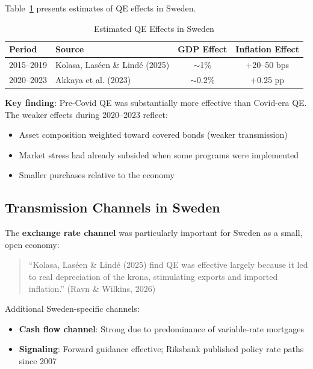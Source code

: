 \documentclass[11pt,a4paper]{article}
\begin{document}
Table~\ref{tab:sweden_effects} presents estimates of QE effects in Sweden.

\begin{table}[H]
\centering
\caption{Estimated QE Effects in Sweden}
\label{tab:sweden_effects}
\begin{tabular}{llcc}
\toprule
\textbf{Period} & \textbf{Source} & \textbf{GDP Effect} & \textbf{Inflation Effect} \\
\midrule
2015--2019 & Kolasa, Las\'{e}en \& Lind\'{e} (2025) & $\sim$1\% & +20--50 bps \\
2020--2023 & Akkaya et al. (2023) & $\sim$0.2\% & +0.25 pp \\
\bottomrule
\end{tabular}
\end{table}

\textbf{Key finding}: Pre-Covid QE was substantially more effective than Covid-era QE. The weaker effects during 2020--2023 reflect:
\begin{itemize}
    \item Asset composition weighted toward covered bonds (weaker transmission)
    \item Market stress had already subsided when some programs were implemented
    \item Smaller purchases relative to the economy
\end{itemize}

\subsection{Transmission Channels in Sweden}

The \textbf{exchange rate channel} was particularly important for Sweden as a small, open economy:

\begin{quote}
``Kolasa, Las\'{e}en \& Lind\'{e} (2025) find QE was effective largely because it led to real depreciation of the krona, stimulating exports and imported inflation.'' (Ravn \& Wilkins, 2026)
\end{quote}

Additional Sweden-specific channels:
\begin{itemize}
    \item \textbf{Cash flow channel}: Strong due to predominance of variable-rate mortgages
    \item \textbf{Signaling}: Forward guidance effective; Riksbank published policy rate paths since 2007
\end{itemize}
\end{document}
